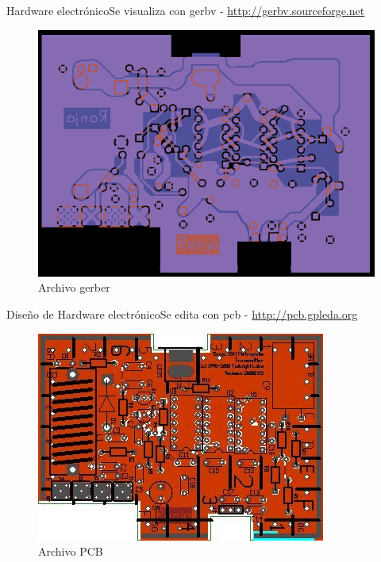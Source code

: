 \documentclass{beamer}
\begin{document}
\begin{frame}{Hardware electrónico}{Se visualiza con \alert{gerbv} - \url{http://gerbv.sourceforge.net}}
  \begin{figure}
    \includegraphics[scale=0.4]{transmisor/transmisor_gerber.png}
    \caption{Archivo gerber}
  \end{figure}
\end{frame}

\begin{frame}{Diseño de Hardware electrónico}{Se edita con \alert{pcb} - \url{http://pcb.gpleda.org}}
  \begin{figure}
    \includegraphics[scale=0.65]{transmisor/metropolis_transmitter}
    \caption{Archivo PCB}
  \end{figure}
\end{frame}
\end{document}
